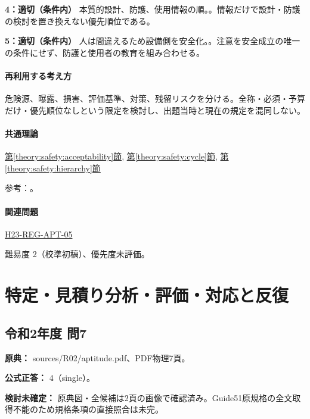 \noindent\textbf{4：適切（条件内）} 本質的設計、防護、使用情報の順。。情報だけで設計・防護の検討を置き換えない優先順位である。\par

\noindent\textbf{5：適切（条件内）} 人は間違えるため設備側を安全化。。注意を安全成立の唯一の条件にせず、防護と使用者の教育を組み合わせる。\par

\paragraph{再利用する考え方} 危険源、曝露、損害、評価基準、対策、残留リスクを分ける。全称・必須・予算だけ・優先順位なしという限定を検討し、出題当時と現在の規定を混同しない。

\paragraph{共通理論} \hyperref[theory:safety:acceptability]{第\ref*{theory:safety:acceptability}節}, \hyperref[theory:safety:cycle]{第\ref*{theory:safety:cycle}節}, \hyperref[theory:safety:hierarchy]{第\ref*{theory:safety:hierarchy}節}

\par 参考：\cite{saf_ra2006,saf_guide51}。

\paragraph{関連問題} \hyperref[q:h23-reg-apt-05]{H23-REG-APT-05}

\par 難易度 2（校準初稿）、優先度未評価。

\section{特定・見積り分析・評価・対応と反復}

\subsection{令和2年度 問7}
\label{q:r02-reg-apt-07}

\noindent\textbf{原典：} sources/R02/aptitude.pdf、PDF物理7頁。

\textbf{公式正答：} 4（single）。

\par\textbf{検討未確定：} 原典図・全候補は2頁の画像で確認済み。Guide51原規格の全文取得不能のため規格条項の直接照合は未完。

